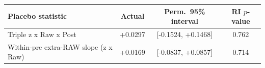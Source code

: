\begin{tabular}{lccc}
\toprule
Placebo statistic & Actual & Perm.\ 95\% interval & RI $p$-value \\
\midrule
Triple z x Raw x Post & +0.0297 & [-0.1524, +0.1468] & 0.762 \\
Within-pre extra-RAW slope (z x Raw) & +0.0169 & [-0.0837, +0.0857] & 0.714 \\
\bottomrule
\end{tabular}